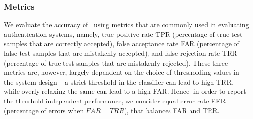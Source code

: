 \subsubsection{Metrics}
We evaluate the accuracy of \systemname~using metrics that are commonly used in evaluating authentication systems, namely,
true positive rate TPR (percentage of true test samples that are
correctly accepted), false acceptance rate FAR (percentage of false test samples that are
mistakenly accepted), and false rejection rate TRR (percentage of true test
samples that are mistakenly rejected). These three metrics are, however, largely dependent on the choice of thresholding values in the system design --
a strict threshold in the classifier can lead to high TRR, while
overly relaxing the same can lead to a high FAR. Hence, in order to report the threshold-independent performance, we consider equal error rate EER (percentage of errors when $FAR = TRR$), that
balances FAR and TRR.



